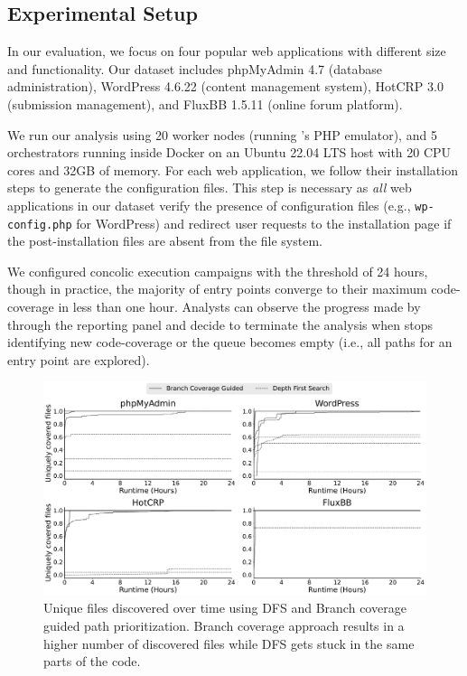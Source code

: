 \subsection{Experimental Setup}

In our evaluation, we focus on four popular web applications with different size and functionality. 
Our dataset includes phpMyAdmin 4.7 (database administration), WordPress 4.6.22 (content management system), HotCRP 3.0 (submission management), and FluxBB 1.5.11 (online forum platform). 

We run our analysis using 20 worker nodes (running \animatedead{}'s PHP emulator), and 5 orchestrators running inside Docker on an Ubuntu 22.04 LTS host with 20 CPU cores and 32GB of memory. 
For each web application, we follow their installation steps to generate the configuration files. 
This step is necessary as \emph{all} web applications in our dataset verify the presence of configuration files (e.g., \texttt{wp-config.php} for WordPress) and redirect user requests to the installation page if the post-installation files are absent from the file system. 

We configured concolic execution campaigns with the threshold of 24 hours, though in practice, the majority of entry points converge to their maximum code-coverage in less than one hour. 
Analysts can observe the progress made by \animatedead{} through the reporting panel and decide to terminate the analysis when \animatedead{} stops identifying new code-coverage or the queue becomes empty (i.e., all paths for an entry point are explored). 

\begin{figure}[t]
    \centering
    \includegraphics[width=\textwidth]{figures/ad/execution_convergence_2rows.pdf}
    \caption{Unique files discovered over time using DFS and Branch coverage guided path prioritization. Branch coverage approach results in a higher number of discovered files while DFS gets stuck in the same parts of the code.}
    \label{fig:execution_convergence}
\end{figure}

